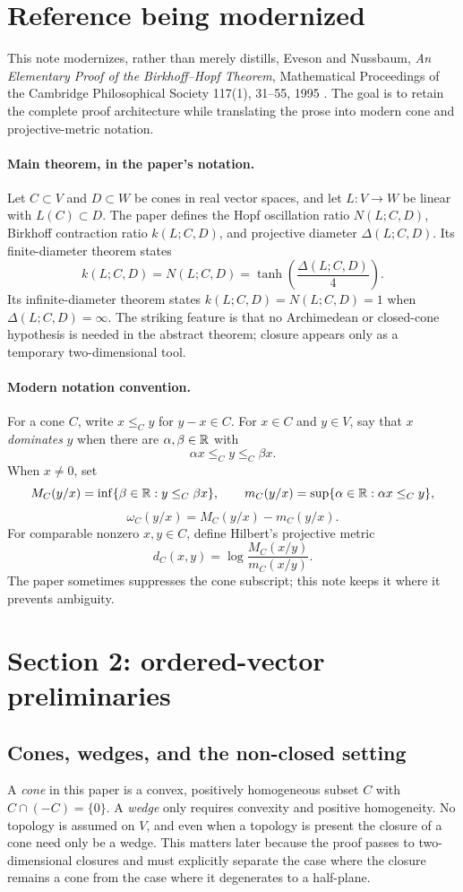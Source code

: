 \section*{Reference being modernized}
This note modernizes, rather than merely distills, Eveson and Nussbaum,
\emph{An Elementary Proof of the Birkhoff--Hopf Theorem}, Mathematical Proceedings of the Cambridge Philosophical Society 117(1), 31--55, 1995 \cite{EvesonNussbaum1995}.
The goal is to retain the complete proof architecture while translating the prose into modern cone and projective-metric notation.

\paragraph{Main theorem, in the paper's notation.}
Let $C \subset V$ and $D \subset W$ be cones in real vector spaces, and let $L:V\to W$ be linear with $L(C)\subset D$.
The paper defines the Hopf oscillation ratio $N(L;C,D)$, Birkhoff contraction ratio $k(L;C,D)$, and projective diameter $\Delta(L;C,D)$.
Its finite-diameter theorem states
\[
  k(L;C,D)=N(L;C,D)=\tanh\!\left(\frac{\Delta(L;C,D)}{4}\right).
\]
Its infinite-diameter theorem states $k(L;C,D)=N(L;C,D)=1$ when $\Delta(L;C,D)=\infty$.
The striking feature is that no Archimedean or closed-cone hypothesis is needed in the abstract theorem; closure appears only as a temporary two-dimensional tool.

\paragraph{Modern notation convention.}
For a cone $C$, write $x\le_C y$ for $y-x\in C$.
For $x\in C$ and $y\in V$, say that $x$ \emph{dominates} $y$ when there are $\alpha,\beta\in\mathbb{R}$ with
\[
  \alpha x \le_C y \le_C \beta x .
\]
When $x\ne0$, set
\[
  M_C(y/x)=\inf\{\beta\in\mathbb{R}: y\le_C \beta x\},\qquad
  m_C(y/x)=\sup\{\alpha\in\mathbb{R}: \alpha x\le_C y\},
\]
\[
  \omega_C(y/x)=M_C(y/x)-m_C(y/x).
\]
For comparable nonzero $x,y\in C$, define Hilbert's projective metric
\[
  d_C(x,y)=\log \frac{M_C(x/y)}{m_C(x/y)}.
\]
The paper sometimes suppresses the cone subscript; this note keeps it where it prevents ambiguity.

\section{Section 2: ordered-vector preliminaries}

\subsection{Cones, wedges, and the non-closed setting}
A \emph{cone} in this paper is a convex, positively homogeneous subset $C$ with $C\cap(-C)=\{0\}$.
A \emph{wedge} only requires convexity and positive homogeneity.
No topology is assumed on $V$, and even when a topology is present the closure of a cone need only be a wedge.
This matters later because the proof passes to two-dimensional closures and must explicitly separate the case where the closure remains a cone from the case where it degenerates to a half-plane.

